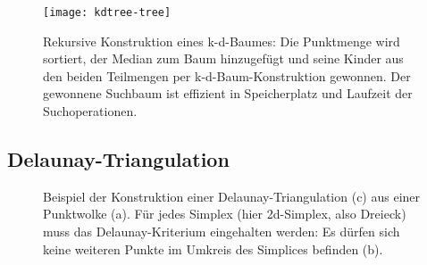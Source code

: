\begin{figure}
  \texttt{[image: kdtree-tree]}
  \caption[Konstruktion eines k-d-Baumes]{
    Rekursive Konstruktion eines k-d-Baumes: Die Punktmenge wird sortiert, der Median zum Baum hinzugefügt und seine Kinder aus den beiden Teilmengen per k-d-Baum-Konstruktion gewonnen.
    Der gewonnene Suchbaum ist effizient in Speicherplatz und Laufzeit der Suchoperationen.
  }
  \label{fig:kdtree}
\end{figure}


\subsection{Delaunay-Triangulation}
\label{datadelaunay}

\begin{figure}
  \centering
  \def\svgwidth{\textwidth}
  
  \caption[Delaunay-Triangulation]{Beispiel der Konstruktion einer Delaunay-Triangulation (c) aus einer Punktwolke (a).
    Für jedes Simplex (hier 2d-Simplex, also Dreieck) muss das Delaunay-Kriterium eingehalten werden:
    Es dürfen sich keine weiteren Punkte im Umkreis des Simplices befinden (b).
  }
  \label{fig:delaunay}
\end{figure}

